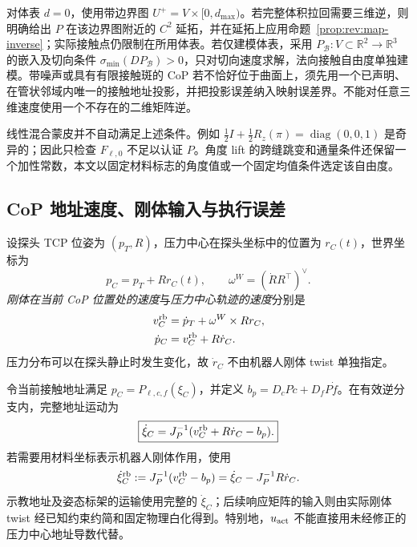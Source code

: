 \documentclass[11pt,a4paper]{article}
\numberwithin{equation}{section}
\theoremstyle{definition}
\newcommand{\R}{\mathbb R}
\begin{document}
对体表 $d=0$，使用带边界图 $U^+=V\times[0,d_{\max})$。若完整体积拉回需要三维逆，则明确给出 $P$ 在该边界图附近的 $C^2$ 延拓，并在延拓上应用命题~\ref{prop:rev:map-inverse}；实际接触点仍限制在所用体表。若仅建模体表，采用 $P_{\mathcal B}:V\subset\R^2\to\R^3$ 的嵌入及切向条件 $\sigma_{\min}(D P_{\mathcal B})>0$，只对切向速度求解，法向接触自由度单独建模。带噪声或具有有限接触斑的 CoP 若不恰好位于曲面上，须先用一个已声明、在管状邻域内唯一的接触地址投影，并把投影误差纳入映射误差界。不能对任意三维速度使用一个不存在的二维矩阵逆。

线性混合蒙皮并不自动满足上述条件。例如 $\tfrac12I+\tfrac12R_z(\pi)=\operatorname{diag}(0,0,1)$ 是奇异的；因此只检查 $F_{\ell,0}$ 不足以认证 $P$。角度 lift 的跨缝跳变和通量条件还保留一个加性常数，本文以固定材料标志的角度值或一个固定均值条件选定该自由度。

\subsection{CoP 地址速度、刚体输入与执行误差}
\label{sec:rev:cop-input}
设探头 TCP 位姿为 $(p_T,R)$，压力中心在探头坐标中的位置为 $r_C(t)$，世界坐标为
\begin{equation}
 p_C=p_T+Rr_C(t),\qquad \omega^W=(\dot R R^\top)^\vee.
 \label{eq:rev:cop-position}
\end{equation}
\emph{刚体在当前 CoP 位置处的速度}与\emph{压力中心轨迹的速度}分别是
\begin{align}
 v_C^{\rm rb}&=\dot p_T+\omega^W\times Rr_C,\\
 \dot p_C&=v_C^{\rm rb}+R\dot r_C.
 \label{eq:rev:cop-velocities}
\end{align}
压力分布可以在探头静止时发生变化，故 $\dot r_C$ 不由机器人刚体 twist 单独指定。

令当前接触地址满足 $p_C=P_{\ell,c,f}(\xi_C)$，并定义 $b_p=D_cP\dot c+D_fP\dot f$。在有效逆分支内，完整地址运动为
\begin{equation}
 \boxed{\dot\xi_C=J_P^{-1}(v_C^{\rm rb}+R\dot r_C-b_p).}
 \label{eq:rev:cop-pullback}
\end{equation}
若需要用材料坐标表示机器人刚体作用，使用
\begin{equation}
 \dot\xi_C^{\rm rb}:=J_P^{-1}(v_C^{\rm rb}-b_p)
 =\dot\xi_C-J_P^{-1}R\dot r_C.
 \label{eq:rev:rigid-material-input}
\end{equation}
示教地址及姿态标架的运输使用完整的 $\dot\xi_C$；后续响应矩阵的输入则由实际刚体 twist 经已知约束约简和固定物理白化得到。特别地，$u_{\rm act}$ 不能直接用未经修正的压力中心地址导数代替。
\end{document}

